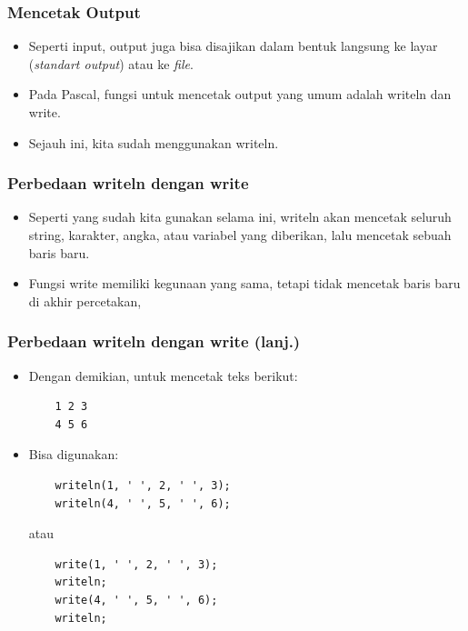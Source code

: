 \documentclass{beamer}
\begin{document}
\begin{frame}
\frametitle{Mencetak Output}
\begin{itemize}
	\item Seperti input, output juga bisa disajikan dalam bentuk langsung ke layar (\textit{standart output}) atau ke \textit{file}.
	\item Pada Pascal, fungsi untuk mencetak output yang umum adalah \alert{writeln} dan \alert{write}.
	\item Sejauh ini, kita sudah menggunakan writeln.
\end{itemize}
\end{frame}

\begin{frame}[fragile]
\frametitle{Perbedaan writeln dengan write}
\begin{itemize}
	\item Seperti yang sudah kita gunakan selama ini, writeln akan mencetak seluruh string, karakter, angka, atau variabel yang diberikan, lalu \alert{mencetak sebuah baris baru}.
	\item Fungsi write memiliki kegunaan yang sama, tetapi tidak \alert{mencetak baris baru} di akhir percetakan,
\end{itemize}
\end{frame}

\begin{frame}[fragile]
\frametitle{Perbedaan writeln dengan write (lanj.)}
\begin{itemize}
	\item Dengan demikian, untuk mencetak teks berikut:
	\begin{lstlisting}
	1 2 3
	4 5 6
	\end{lstlisting}
	\item Bisa digunakan:
	\begin{lstlisting}
	writeln(1, ' ', 2, ' ', 3);
	writeln(4, ' ', 5, ' ', 6);
	\end{lstlisting}
	atau
	\begin{lstlisting}
	write(1, ' ', 2, ' ', 3);
	writeln;
	write(4, ' ', 5, ' ', 6);
	writeln;
	\end{lstlisting}
\end{itemize}
\end{frame}
\end{document}
